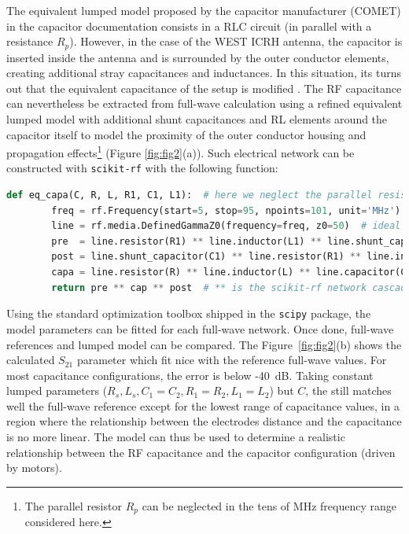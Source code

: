 \documentclass[%
aip,
cp,  %
amsmath,amssymb,%
reprint,%
]{revtex4-2}
\begin{document}
	
	The equivalent lumped model proposed by the capacitor manufacturer (COMET) in the capacitor documentation consists in a RLC circuit (in parallel with a resistance $R_p$). 
	However, in the case of the WEST ICRH antenna, the capacitor is inserted inside the antenna and is surrounded by the outer conductor elements, creating additional stray capacitances and inductances. In this situation, its turns out that the equivalent capacitance of the setup is modified \cite{Helou2018_PhD}. The RF capacitance can nevertheless be extracted from full-wave calculation using a refined equivalent lumped model with additional shunt capacitances and RL elements around the capacitor itself to model the proximity of the outer conductor housing and propagation effects\footnote{The parallel resistor $R_p$ can be neglected in the tens of MHz frequency range considered here.} (Figure \ref{fig:fig2}(a)). Such electrical network can be constructed with \texttt{scikit-rf} with the following function:
	
	\begin{lstlisting}[language=Python]
	def eq_capa(C, R, L, R1, C1, L1):  # here we neglect the parallel resistance R_p
		freq = rf.Frequency(start=5, stop=95, npoints=101, unit='MHz')
		line = rf.media.DefinedGammaZ0(frequency=freq, z0=50)  # ideal transmission line media
		pre  = line.resistor(R1) ** line.inductor(L1) ** line.shunt_capacitor(C1)
		post = line.shunt_capacitor(C1) ** line.resistor(R1) ** line.inductor(L1)
		capa = line.resistor(R) ** line.inductor(L) ** line.capacitor(C)
		return pre ** cap ** post  # ** is the scikit-rf network cascading operator	\end{lstlisting}
	
	Using the standard optimization toolbox shipped in the \texttt{scipy} package, the model parameters can be fitted for each full-wave network. Once done, full-wave references and lumped model can be compared. The Figure~\ref{fig:fig2}(b) shows the calculated $S_{21}$ parameter which fit nice with the reference full-wave values. For most capacitance configurations, the error is below -40~dB. Taking constant lumped parameters ($R_s, L_s, C_1=C_2, R_1=R_2, L_1=L_2$) but $C$, the still matches well the full-wave reference except for the lowest range of capacitance values, in a region where the relationship between the electrodes distance and the capacitance is no more linear. The model can thus be used to determine a realistic relationship between the RF capacitance and the capacitor configuration (driven by motors).
	
\end{document}
